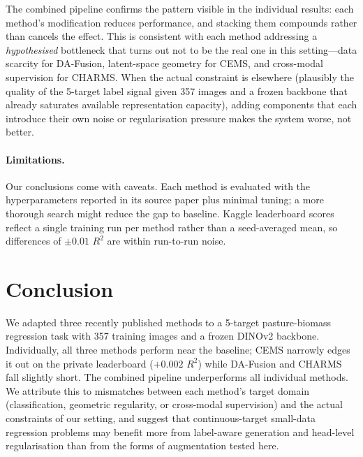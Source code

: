 \documentclass[10pt, a4paper]{article}
\begin{document}
The combined pipeline confirms the pattern visible in the individual results:
each method's modification reduces performance, and stacking them compounds
rather than cancels the effect. This is consistent with each method
addressing a \emph{hypothesised} bottleneck that turns out not to be the real
one in this setting---data scarcity for DA-Fusion, latent-space geometry for
CEMS, and cross-modal supervision for CHARMS. When the actual constraint is
elsewhere (plausibly the quality of the 5-target label signal given 357
images and a frozen backbone that already saturates available representation
capacity), adding components that each introduce their own noise or
regularisation pressure makes the system worse, not better.

\paragraph{Limitations.}
Our conclusions come with caveats. Each method is evaluated with the
hyperparameters reported in its source paper plus minimal tuning; a more
thorough search might reduce the gap to baseline. Kaggle leaderboard scores
reflect a single training run per method rather than a seed-averaged mean,
so differences of $\pm 0.01$ $R^{2}$ are within run-to-run noise.

\section{Conclusion}
We adapted three recently published methods to a 5-target pasture-biomass
regression task with 357 training images and a frozen DINOv2 backbone.
Individually, all three methods perform near the baseline; CEMS narrowly edges
it out on the private leaderboard ($+0.002$ $R^{2}$) while DA-Fusion and CHARMS
fall slightly short. The combined pipeline underperforms all individual methods. We attribute
this to mismatches between each method's target domain (classification,
geometric regularity, or cross-modal supervision) and the actual constraints
of our setting, and suggest that continuous-target small-data regression
problems may benefit more from label-aware generation and head-level
regularisation than from the forms of augmentation tested here.
\end{document}
